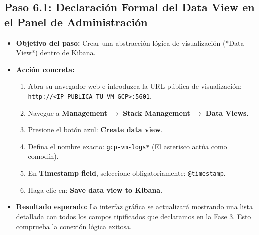 \documentclass[
  coursetitle={Cómputo Nube y Tecnologías Emergentes},
  coursehours={96},
  coursedate={Verano 2026},
  doctype={Guía de Laboratorio Práctico},
  otherlangs={english,french},
  authorname={Lázaro},
  authorsurname={Bustio-Martínez},
  authortitle={PhD},
  role={Profesor Investigador},
  email={lbustio@inaoe.mx},
  phone={5559504000},
  ext={7459},
  institution={Instituto Nacional de Astrofísica, Óptica y Electrónica (INAOE)},
  department={Maestría en Ciencias en Tecnologías de Seguridad},
  address={Luis Enrique Erro 1, Sta. Ma. Tonantzintla, San Andrés Cholula, CP 72840, Puebla, México},
  margin={0.5in}
]{../../lbustio_lecture_notes}
\begin{document}
\subsection{Paso 6.1: Declaración Formal del Data View en el Panel de Administración}
\begin{itemize}
    \item \textbf{Objetivo del paso:} Crear una abstracción lógica de visualización (*Data View*) dentro de Kibana.
    \item \textbf{Acción concreta:} 
    \begin{enumerate}
        \item Abra su navegador web e introduzca la URL pública de visualización: \texttt{http://<IP\_PUBLICA\_TU\_VM\_GCP>:5601}.
        \item Navegue a \textbf{Management} $\rightarrow$ \textbf{Stack Management} $\rightarrow$ \textbf{Data Views}.
        \item Presione el botón azul: \textbf{Create data view}.
        \item Defina el nombre exacto: \texttt{gcp-vm-logs*} (El asterisco actúa como comodín).
        \item En \textbf{Timestamp field}, seleccione obligatoriamente: \texttt{@timestamp}.
        \item Haga clic en: \textbf{Save data view to Kibana}.
    \end{enumerate}
    \item \textbf{Resultado esperado:} La interfaz gráfica se actualizará mostrando una lista detallada con todos los campos tipificados que declaramos en la Fase 3. Esto comprueba la conexión lógica exitosa.
\end{itemize}
\end{document}
